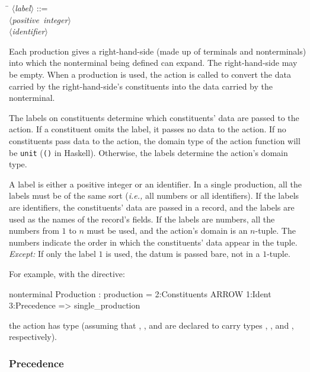 \documentclass[10pt]{article}
\newcommand{\nonterm}[1]{\mbox{$\langle${\it{}#1}$\rangle$}}
\begin{document}
\begin{strictcode}
\begin{strictcode}
\begin{strictcode}
\begin{strictcode}
\begin{tabbing}
\quad \= \kill
\nonterm{label} ::=
\\ \>
\nonterm{positive integer}
\\ \>
\nonterm{identifier}
\end{tabbing}

Each production gives a right-hand-side (made up of terminals and
nonterminals) into which the nonterminal being defined can expand.
The right-hand-side may be empty.  When a production is used, the
action is called to convert the data carried by the right-hand-side's
constituents into the data carried by the nonterminal.

The labels on constituents determine which constituents' data are
passed to the action.  If a constituent omits the label, it passes no
data to the action.  If no constituents pass data to the action, the
domain type of the action function will be {\tt unit} ({\tt ()} in
Haskell).  Otherwise, the labels determine the action's domain type.

A label is either a positive integer or an identifier.  In a single
production, all the labels must be of the same sort ({\em i.e.,} all
numbers or all identifiers).  If the labels are identifiers, the
constituents' data are passed in a record, and the labels are used as
the names of the record's fields.  If the labels are numbers, all the
numbers from $1$ to $n$ must be used, and the action's domain is an
$n$-tuple.  The numbers indicate the order in which the constituents'
data appear in the tuple.  {\em Except:} If only the label $1$ is
used, the datum is passed bare, not in a $1$-tuple.

For example, with the directive:

\begin{code}
nonterminal Production : production =
   2:Constituents ARROW 1:Ident 3:Precedence => single_production
\end{code}

\noindent
the action  has type  (assuming that , , and
 are declared to carry types ,
, and , respectively).



\subsubsection{Precedence}


\end{strictcode}
\end{strictcode}
\end{strictcode}
\end{strictcode}
\end{document}
